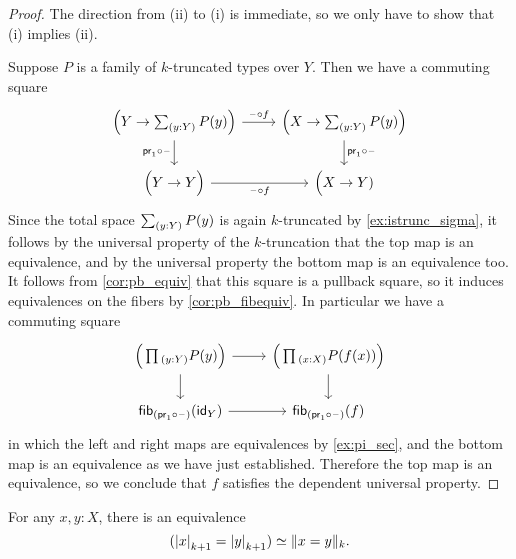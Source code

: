 \begin{proof}
The direction from (ii) to (i) is immediate, so we only have to show that (i) implies (ii).

Suppose $P$ is a family of $k$-truncated types over $Y$.  
Then we have a commuting square
\begin{equation*}
\begin{tikzcd}
\Big(Y\to\sm{y:Y}P(y)\Big) \arrow[r,"\blank\circ f"] \arrow[d,swap,"\proj 1 \circ\blank"] & \Big(X\to \sm{y:Y}P(y)\Big) \arrow[d,"\proj 1\circ \blank"] \\
\Big(Y\to Y\Big) \arrow[r,swap,"\blank\circ f"] & \Big(X\to Y)
\end{tikzcd}
\end{equation*}
Since the total space $\sm{y:Y}P(y)$ is again $k$-truncated by \cref{ex:istrunc_sigma}, it follows by the universal property of the $k$-truncation that the top map is an equivalence, and by the universal property the bottom map is an equivalence too. It follows from \cref{cor:pb_equiv} that this square is a pullback square, so it induces equivalences on the fibers by \cref{cor:pb_fibequiv}. In particular we have a commuting square
\begin{equation*}
\begin{tikzcd}
\Big(\prd{y:Y}P(y)\Big) \arrow[r] \arrow[d] & \Big(\prd{x:X}P(f(x))\Big) \arrow[d] \\
\fib{(\proj 1\circ \blank)}{\idfunc[Y]} \arrow[r] & \fib{(\proj 1 \circ \blank)}{f}
\end{tikzcd}
\end{equation*}
in which the left and right maps are equivalences by \cref{ex:pi_sec}, and the bottom map is an equivalence as we have just established. Therefore the top map is an equivalence, so we conclude that $f$ satisfies the dependent universal property.
\end{proof}


\begin{thm}\label{thm:trunc_id}
For any $x,y:X$, there is an equivalence
\begin{equation*}
\eqv{(\tproj{k+1}{x}=\tproj{k+1}{y})}{\trunc{k}{x=y}}.
\end{equation*}
\end{thm}

